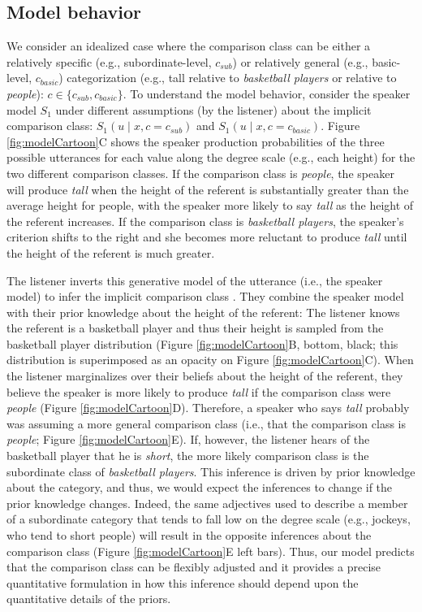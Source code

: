 \documentclass[doc]{apa6}
\begin{document}
  
\subsection{Model behavior}

We consider an idealized case where the comparison class can be either a relatively specific (e.g., subordinate-level, \(c_{sub}\)) or relatively general (e.g., basic-level, \(c_{basic}\)) categorization (e.g., tall relative to \emph{basketball players} or relative to \emph{people}): \(c \in \{c_{sub}, c_{basic}\}\).
To understand the model behavior, consider the speaker model \(S_1\) under different assumptions (by the listener) about the implicit comparison class: \(S_{1}(u \mid x, c = c_{sub})\) and \(S_{1}(u \mid x, c = c_{basic})\). 
Figure \ref{fig:modelCartoon}C shows the speaker production probabilities of the three possible utterances for each value along the degree scale (e.g., each height) for the two different comparison classes.  If the comparison class is \emph{people}, the speaker will produce \emph{tall} when the height of the referent is substantially greater than the average height for people, with the speaker more likely to say \emph{tall} as the height of the referent increases.
  If the comparison class is \emph{basketball players}, the speaker's criterion shifts to the right and she becomes more reluctant to produce \emph{tall} until the height of the referent is much greater. 

The listener inverts this generative model of the utterance (i.e., the speaker model) to infer the implicit comparison class .
 They combine the speaker model with their prior knowledge about the height of the referent: The listener knows the referent is a basketball player and thus their height is sampled from the basketball player distribution (Figure \ref{fig:modelCartoon}B, bottom, black; this distribution is superimposed as an opacity on Figure \ref{fig:modelCartoon}C).
  When the listener marginalizes over their beliefs about the height of the referent, they believe the speaker is more likely to produce \emph{tall} if the comparison class were \emph{people} (Figure \ref{fig:modelCartoon}D).  
 Therefore,  a speaker who says \emph{tall} probably was assuming a more general comparison class (i.e., that the comparison class is \emph{people}; Figure \ref{fig:modelCartoon}E). 
If, however, the listener hears of the basketball player that he is \emph{short}, the more likely comparison class is the subordinate class of \emph{basketball players}.
This inference is driven by prior knowledge about the category, and thus, we would expect the inferences to change if the prior knowledge changes.
Indeed, the same adjectives used to describe a member of a subordinate category that tends to fall low on the degree scale (e.g., jockeys, who tend to short people) will result in the opposite inferences about the comparison class (Figure \ref{fig:modelCartoon}E left bars). 
Thus, our model predicts that the comparison class can be flexibly adjusted and it provides a precise quantitative formulation in how this inference should depend upon the quantitative details of the priors. 
\end{document}
